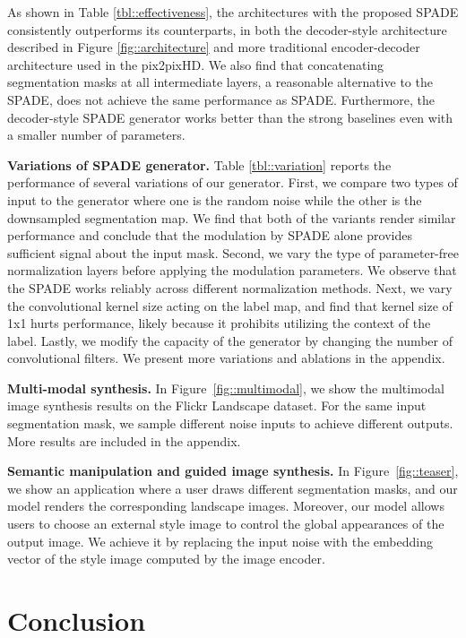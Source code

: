 As shown in Table \ref{tbl::effectiveness}, the architectures with the proposed SPADE consistently outperforms its counterparts, in both the decoder-style architecture described in Figure \ref{fig::architecture} and more traditional encoder-decoder architecture used in the pix2pixHD. We also find that concatenating segmentation masks at all intermediate layers, a reasonable alternative to the SPADE, does not achieve the same performance as SPADE. Furthermore, the decoder-style SPADE generator works better than the strong baselines even with a smaller number of parameters. 

{\bf \bf Variations of SPADE generator.} Table \ref{tbl::variation} reports the performance of several variations of our generator. First, we compare two types of input to the generator where one is the random noise while the other is the downsampled segmentation map. We find that both of the variants render similar performance and conclude that the modulation by SPADE alone provides sufficient signal about the input mask. Second, we vary the type of parameter-free normalization layers before applying the modulation parameters. We observe that the SPADE works reliably across different normalization methods. Next, we vary the convolutional kernel size acting on the label map, and find that kernel size of 1x1 hurts performance, likely because it prohibits utilizing the context of the label. Lastly, we modify the capacity of the generator by changing the number of convolutional filters. We present more variations and ablations in the appendix.

{\bf Multi-modal synthesis.} In Figure~\ref{fig::multimodal}, we show the multimodal image synthesis results on the Flickr Landscape dataset. For the same input segmentation mask, we sample different noise inputs to achieve different outputs. More results are included in the appendix.

{\bf Semantic manipulation and guided image synthesis.} In Figure~\ref{fig::teaser}, we show an application where a user draws different segmentation masks, and our model renders the corresponding landscape images. Moreover, our model allows users to choose an external style image to control the global appearances of the output image. We achieve it by replacing the input noise with the embedding vector of the style image computed by the image encoder.

\section{Conclusion}\label{sec:conclusion}

